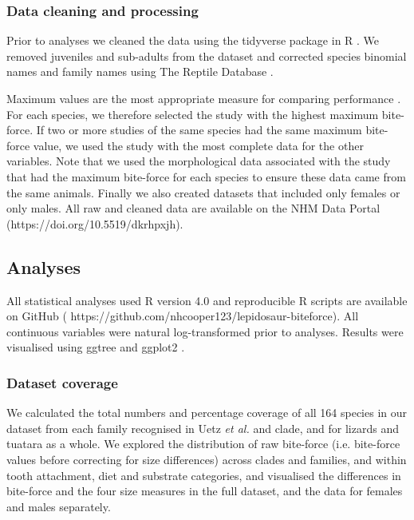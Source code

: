 \documentclass[a4paper, 12pt]{article}
\begin{document}
\subsubsection{Data cleaning and processing}
Prior to analyses we cleaned the data using the tidyverse package \cite{wickham2019welcome} in R \cite{R-Core-Team:2020}. 
We removed juveniles and sub-adults from the dataset and corrected species binomial names and family names using The Reptile Database \cite{uetz2020reptile}. 

Maximum values are the most appropriate measure for comparing performance \cite{hertz1988time,losos2002cautionary}. 
For each species, we therefore selected the study with the highest maximum bite-force. 
If two or more studies of the same species had the same maximum bite-force value, we used the study with the most complete data for the other variables. 
Note that we used the morphological data associated with the study that had the maximum bite-force for each species to ensure these data came from the same animals. 
Finally we also created datasets that included only females or only males. 
All raw and cleaned data are available on the NHM Data Portal (https://doi.org/10.5519/dkrhpxjh\cite{lepidosaurdata}). 

\subsection{Analyses}
All statistical analyses used R version 4.0 \cite{R-Core-Team:2020} and reproducible R scripts are available on GitHub ( https://github.com/nhcooper123/lepidosaur-biteforce). 
All continuous variables were natural log-transformed prior to analyses. 
Results were visualised using ggtree \cite{yu2017ggtree} and ggplot2 \cite{wickham2011ggplot2}.

\subsubsection{Dataset coverage}
We calculated the total numbers and percentage coverage of all 164 species in our dataset from each family recognised in Uetz \textit{et al.}\cite{uetz2020reptile} and clade\cite{burbrink2020interrogating}, and for lizards and tuatara as a whole.
We explored the distribution of raw bite-force (i.e. bite-force values before correcting for size differences) across clades and families, and within tooth attachment, diet and substrate categories, and visualised the differences in bite-force and the four size measures in the full dataset, and the data for females and males separately.
\end{document}
